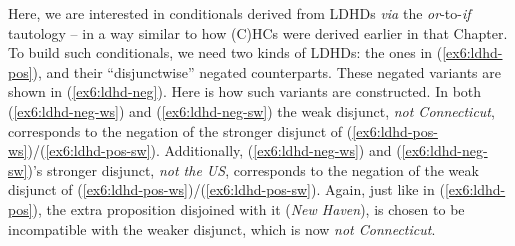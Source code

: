 \begin{exe}
	\ex\label{ex6:ldhd-pos}
	\begin{xlist}
		\label{ex6:ldhd-pos-ws}
		\label{ex6:ldhd-pos-sw}
	\end{xlist}
\end{exe}


Here, we are interested in conditionals derived from LDHDs \textit{via} the \textit{or}-to-\textit{if} tautology -- in a way similar to how (C)HCs were derived earlier in that Chapter. To build such conditionals, we need two kinds of LDHDs: the ones in (\ref{ex6:ldhd-pos}), and their ``disjunctwise'' negated counterparts. These negated variants are shown in (\ref{ex6:ldhd-neg}). Here is how such variants are constructed. In both (\ref{ex6:ldhd-neg-ws}) and (\ref{ex6:ldhd-neg-sw}) the weak disjunct, \textit{not Connecticut}, corresponds to the negation of the stronger disjunct of (\ref{ex6:ldhd-pos-ws})/(\ref{ex6:ldhd-pos-sw}). Additionally, (\ref{ex6:ldhd-neg-ws}) and (\ref{ex6:ldhd-neg-sw})'s stronger disjunct, \textit{not the US}, corresponds to the negation of the weak disjunct of (\ref{ex6:ldhd-pos-ws})/(\ref{ex6:ldhd-pos-sw}). Again, just like in (\ref{ex6:ldhd-pos}), the extra proposition disjoined with it (\textit{New Haven}), is chosen to be incompatible with the weaker disjunct, which is now \textit{not Connecticut}. 

\begin{exe}
	\ex\label{ex6:ldhd-neg}
	\begin{xlist}
		\label{ex6:ldhd-neg-ws}
		\label{ex6:ldhd-neg-sw}
	\end{xlist}
\end{exe}

